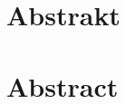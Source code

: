 \documentclass[a4paper,11pt,oneside]{book}
\begin{document}
\section{Abstrakt}
\label{sec:abstrakt}





\section{Abstract}
 
\newpage



\setcounter{tocdepth}{3}
\tableofcontents

\mainmatter




\printbibliography[heading=bibintoc]
\printnomenclature[5cm]
\end{document}
